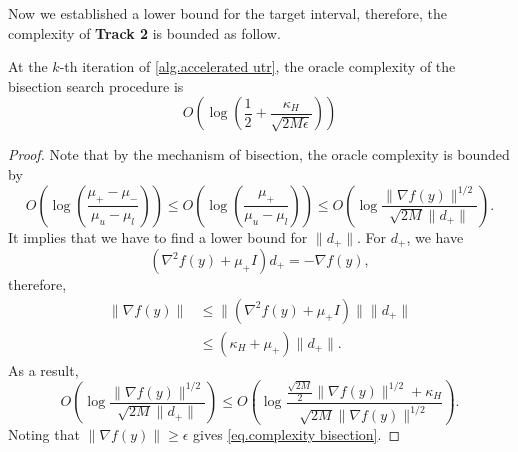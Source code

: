 \documentclass{article}
\begin{document}
Now we established a lower bound for the target interval, therefore, the complexity of \textbf{Track 2} is bounded as follow.
\begin{lemma}
    \label{lem.bound initial interval}
    At the $k$-th iteration of \autoref{alg.accelerated utr}, the oracle complexity of the bisection search procedure is 
    \begin{equation}
        \label{eq.complexity bisection}
        O \left (\log \left(\frac{1}{2}+\frac{\kappa_H}{\sqrt{2M\epsilon}}\right)\right)
    \end{equation}
\end{lemma}
\begin{proof}
    Note that by the mechanism of bisection, the oracle complexity is bounded by
    \begin{equation*}
        O\left(\log\left(\frac{\mu_+-\mu_-}{\mu_u-\mu_l}\right)\right)\leq O\left(\log\left(\frac{\mu_+}{\mu_u-\mu_l}\right)\right) \leq O\left(\log\frac{\|\nabla f(y)\|^{1/2}}{\sqrt{2M}\|d_+\|}\right).
    \end{equation*}
    It implies that we have to find a lower bound for $\|d_+\|$. For $d_+$, we have
    \begin{equation*}
        \left(\nabla^2 f(y)+\mu_+I\right)d_+ = -\nabla f(y),
    \end{equation*}
    therefore,
    \begin{equation*}
    \begin{aligned}
        \|\nabla f(y)\| &\leq \|\left(\nabla^2 f(y)+\mu_+I\right)\|\|d_+\|\\
        &\leq (\kappa_H+\mu_+)\|d_+\|.
        \end{aligned}
    \end{equation*}
    As a result,
    \begin{equation*}
        O\left(\log\frac{\|\nabla f(y)\|^{1/2}}{\sqrt{2M}\|d_+\|}\right)\leq O\left(\log \frac{\frac{\sqrt{2M}}{2}\|\nabla f(y)\|^{1/2}+\kappa_H}{\sqrt{2M}\|\nabla f(y)\|^{1/2}}\right).
    \end{equation*}
    Noting that $\|\nabla f(y)\|\geq \epsilon$ gives \eqref{eq.complexity bisection}.
\end{proof}
\end{document}

